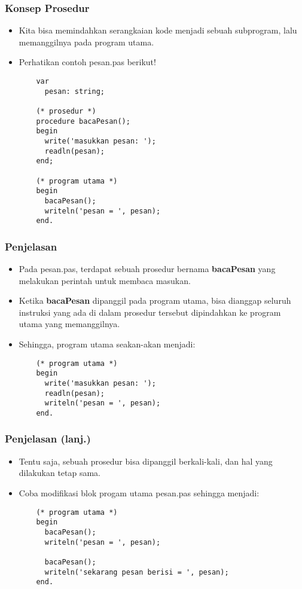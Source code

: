 \begin{frame}[fragile]
\frametitle{Konsep Prosedur}
\begin{itemize}
  \item Kita bisa memindahkan serangkaian kode menjadi sebuah subprogram, lalu memanggilnya pada program utama.
  \item Perhatikan contoh pesan.pas berikut!
  \begin{lstlisting}
    var
      pesan: string;

    (* prosedur *)
    procedure bacaPesan();
    begin
      write('masukkan pesan: ');
      readln(pesan);
    end;

    (* program utama *)
    begin
      bacaPesan();
      writeln('pesan = ', pesan);
    end.
  \end{lstlisting}
\end{itemize}
\end{frame}

\begin{frame}[fragile]
\frametitle{Penjelasan}
\begin{itemize}
  \item Pada pesan.pas, terdapat sebuah prosedur bernama \textbf{bacaPesan} yang melakukan perintah untuk membaca masukan.
  \item Ketika \textbf{bacaPesan} dipanggil pada program utama, bisa dianggap seluruh instruksi yang ada di dalam prosedur tersebut dipindahkan ke program utama yang memanggilnya.
  \item Sehingga, program utama seakan-akan menjadi:
  \begin{lstlisting}
    (* program utama *)
    begin
      write('masukkan pesan: ');
      readln(pesan);
      writeln('pesan = ', pesan);
    end.
  \end{lstlisting}
\end{itemize}
\end{frame}

\begin{frame}[fragile]
\frametitle{Penjelasan (lanj.)}
\begin{itemize}
  \item Tentu saja, sebuah prosedur bisa dipanggil berkali-kali, dan hal yang dilakukan tetap sama.
  \item Coba modifikasi blok progam utama pesan.pas sehingga menjadi:
  \begin{lstlisting}
    (* program utama *)
    begin
      bacaPesan();
      writeln('pesan = ', pesan);

      bacaPesan();
      writeln('sekarang pesan berisi = ', pesan);
    end.
  \end{lstlisting}
\end{itemize}
\end{frame}

